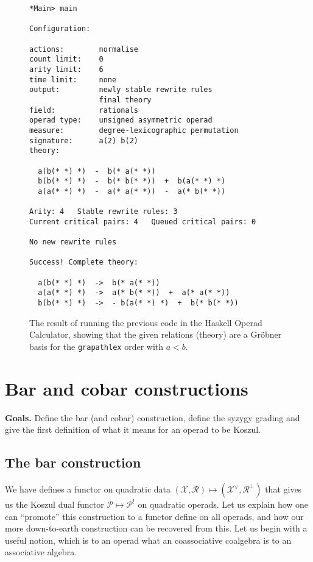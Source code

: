 \documentclass[fleqn, a4paper, twoside]{article}
\newcommand{\0}{\langle 0\rangle}
\newcommand{\XX}{\mathcal{X}}
\newcommand{\RR}{\mathcal{R}}
\DeclareRobustCommand{\[}{\begin{equation}}%
\DeclareRobustCommand{\]}{\end{equation}}%
\theoremstyle{mytheorem}
\theoremstyle{introthm}
\theoremstyle{mydefinition}
\theoremstyle{mydefinition2}
\theoremstyle{plain} %
\newcommand{\?}{\,?\,}
\newcommand{\PP}{{\mathcal{P}}}
\theoremstyle{mytheorem}
\theoremstyle{plain} %
\newcommand\blankpage{%
    \null
    \thispagestyle{empty}%
    \newpage}
\begin{document}
\begin{figure}
\begin{verbatim}
*Main> main

Configuration:

actions:        normalise 
count limit:    0
arity limit:    6
time limit:     none
output:         newly stable rewrite rules
                final theory
field:          rationals
operad type:    unsigned asymmetric operad
measure:        degree-lexicographic permutation 
signature:      a(2) b(2)
theory:

  a(b(* *) *)  -  b(* a(* *))
  b(b(* *) *)  -  b(* b(* *))  +  b(a(* *) *)
  a(a(* *) *)  -  a(* a(* *))  -  a(* b(* *))

Arity: 4   Stable rewrite rules: 3   
Current critical pairs: 4   Queued critical pairs: 0

No new rewrite rules

Success! Complete theory: 

  a(b(* *) *)  ->  b(* a(* *))
  a(a(* *) *)  ->  a(* b(* *))  +  a(* a(* *))
  b(b(* *) *)  ->  - b(a(* *) *)  +  b(* b(* *))
\end{verbatim}
\caption{The result of running the previous code in
the Haskell Operad Calculator, showing that the
given relations (theory) are a Gr\"obner basis for
the \texttt{grapathlex} order with $a<b$.}
\end{figure}
\afterpage{\blankpage}
\newpage

\section{Bar and cobar constructions}
\textbf{Goals.} Define the bar (and cobar) construction,
define the syzygy grading and give the first definition
of what it means for an operad to be Koszul. 

\subsection{The bar construction}

We have defines a functor on quadratic data $(\XX,\RR) \longmapsto 
(\XX^\vee,\RR^\perp)$ that gives us the Koszul dual
functor $\PP \longmapsto \PP^!$ on quadratic operads.
Let us explain how one can ``promote'' this construction
to a functor define on all operads, and how our more
down-to-earth construction can be recovered from
this. Let us begin with a useful notion, which is
to an operad what an coassociative coalgebra is to 
an associative algebra.
\end{document}

